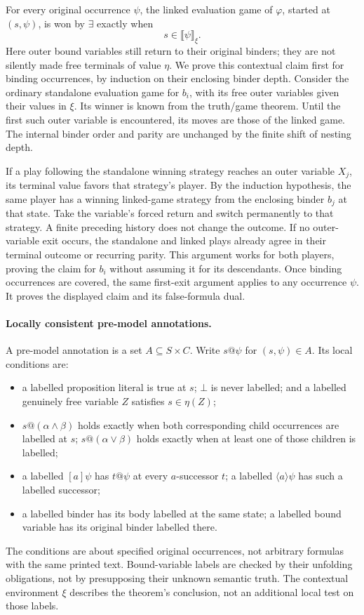 For every original occurrence
\(\psi\), the linked evaluation
game of \(\varphi\), started
at \((s,\psi)\), is won by
\(\exists\) exactly when
\[
 s\in\llbracket\psi\rrbracket_\xi.
\]
Here outer bound variables still
return to their original binders;
they are not silently made
free terminals of value \(\eta\).
We prove this contextual claim
first for binding occurrences,
by induction on their enclosing
binder depth.
Consider the ordinary standalone
evaluation game for \(b_i\),
with its free outer variables
given their values in \(\xi\).
Its winner is known from the
truth/game theorem.
Until the first such outer
variable is encountered, its
moves are those of the linked
game. The internal binder order
and parity are unchanged by
the finite shift of nesting depth.

If a play following the standalone
winning strategy reaches an outer
variable \(X_j\), its terminal
value favors that strategy's
player. By the induction
hypothesis, the same player
has a winning linked-game
strategy from the enclosing
binder \(b_j\) at that state.
Take the variable's forced
return and switch permanently
to that strategy.
A finite preceding history
does not change the outcome.
If no outer-variable exit
occurs, the standalone and
linked plays already agree
in their terminal outcome
or recurring parity.
This argument works for
both players, proving the
claim for \(b_i\) without
assuming it for its descendants.
Once binding occurrences are
covered, the same first-exit
argument applies to any
occurrence \(\psi\).
It proves the displayed claim
and its false-formula dual.

\paragraph{Locally consistent pre-model annotations.}
\label{sec:p09-mu-premodel}
A pre-model annotation is a
set \(A\subseteq S\times C\).
Write \(s@\psi\) for
\((s,\psi)\in A\).
Its local conditions are:
\begin{itemize}
\item a labelled proposition
literal is true at \(s\);
\(\bot\) is never labelled;
and a labelled genuinely free
variable \(Z\) satisfies
\(s\in\eta(Z)\);
\item \(s@(\alpha\land\beta)\)
holds exactly when both
corresponding child occurrences
are labelled at \(s\);
\(s@(\alpha\lor\beta)\) holds
exactly when at least one
of those children is labelled;
\item a labelled \([a]\psi\)
has \(t@\psi\) at every
\(a\)-successor \(t\);
a labelled \(\langle a\rangle\psi\)
has such a labelled successor;
\item a labelled binder has
its body labelled at the
same state; a labelled bound
variable has its original
binder labelled there.
\end{itemize}
The conditions are about
specified original occurrences,
not arbitrary formulas with
the same printed text.
Bound-variable labels are
checked by their unfolding
obligations, not by presupposing
their unknown semantic truth.
The contextual environment
\(\xi\) describes the theorem's
conclusion, not an additional
local test on those labels.

